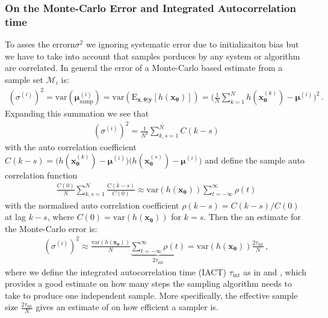 \subsubsection{On the Monte-Carlo Error and Integrated Autocorrelation time}
To asses the errorn$\sigma^2$ we ignoring systematic error due to initializaiton bias but we have to take into account that samples porduces by any system or algorithm are correlated.
In general the error of a Monte-Carlo based estimate from a sample set $\mathcal{M}_i$ is:
\begin{align}
	(\sigma^{(i)})^2 = \text{var}(\bm{\mu}^{(i)}_{\text{samp}} ) =  \text{var}(\text{E}_{\bm{x},\bm{\theta}|\bm{y}} [h(\bm{x}_{\bm{\theta}})]) = \Bigg( \frac{1}{N} \sum_{k=1}^{N} h(\bm{x}^{(k)}_{\bm{\theta}}) - \bm{\mu}^{(i)} \Bigg)^2 \, .
\end{align}
Expanding this summation we see that
\begin{align}
	(\sigma^{(i)})^2	= \frac{1}{N^2} \sum_{k,s=1}^{N} C(k-s)
\end{align}
with the auto correlation coefficient $C(k-s) =  \big( h(\bm{x}^{(k)}_{\bm{\theta}}) - \bm{\mu}^{(i)} \big) \big(h(\bm{x}^{(s)}_{\bm{\theta}}) - \bm{\mu}^{(i)} \big)$ and define the sample auto correlation function
\begin{align}
	\frac{C(0)}{N} \sum_{k,s=1}^{N} \frac{C(k-s)}{C(0)} \approx \text{var}(h(\bm{x}_{\bm{\theta}}) ) \sum_{t = - \infty }^{\infty} \rho(t)
\end{align}
with the normalised auto correlation coefficient $\rho(k-s) =  C(k-s)/ C(0)$ at lag $k-s$, where $C(0) = \text{var}(h(\bm{x}_{\bm{\theta}}) )$ for $k = s$.
Then the an estimate for the Monte-Carlo error is:
\begin{align}
	(\sigma^{(i)})^2   \approx  \frac{\text{var}(h(\bm{x}_{\bm{\theta}}) )}{N} \underbrace{\sum_{t = - \infty }^{\infty} \rho(t)}_{	2\tau_{\text{int}} } = \text{var}(h(\bm{x}_{\bm{\theta}})) \frac{ 2 \tau_{\text{int}} }{N} \, , \label{eq:MCerr}
\end{align}
where we define the integrated autocorrelation time (IACT) $\tau_{\text{int}}$ as in \cite{Sokal1997} and \cite{}, which provides a good estimate on how many steps the sampling algorithm needs to take to produce one independent sample.
More specifically, the effective sample size $\frac{ 2 \tau_{\text{int}} }{N}$ gives an estimate of on how efficient a sampler is.


